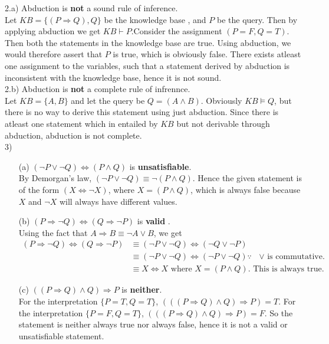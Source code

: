 \documentclass[11pt]{article}
\newcommand{\ra}{\Rightarrow}
\renewcommand{\iff}{\Leftrightarrow}
\begin{document}
2.a) Abduction is \textbf{not} a sound rule of inference. \\
Let $KB  = \{ (P \ra Q) , Q \}$ be the knowledge base , and $P$ be the query.
Then by applying abduction we get $KB \vdash P$.Consider the assignment $(P=F,Q=T)$. 
Then both the statements in the knowledge base are true. Using abduction, we would
therefore assert that $P$ is true, which is obviously false. There exists atleast one
assignment to the variables, such that a statement derived by abduction is inconsistent
with the knowledge base, hence it is not sound. \\

2.b) Abduction is \textbf{not} a complete rule of infrennce. \\
Let $KB  = \{ A, B \}$ and let the query be $Q = (A \land B)$. Obviously $KB \models Q$,
but there is no way to derive this statement using just abduction. Since there is atleast
one statement which in entailed by $KB$ but not derivable through abduction, abduction
is not complete.\\

3)
\begin{enumerate}
	\item[(a)] $(\lnot P \lor \lnot Q) \iff (P \land Q)$ is \textbf{unsatisfiable}. \\
	By Demorgan's law, $(\lnot P \lor \lnot Q) \equiv \lnot (P \land Q)$. Hence the given statement is
	of the form $(X \iff \lnot X)$, where $X = (P \land Q)$, which is always false because $X$ and $\lnot X$
	will always have different values.
	
	\item[(b)] $(P \ra \lnot Q) \iff (Q \ra \lnot P)$ is \textbf{valid} . \\
	Using the fact that $A \ra B \equiv \lnot A \lor B$, we get
	\begin{align*}
		(P \ra \lnot Q) \iff (Q \ra \lnot P) &\equiv (\lnot P \lor \lnot Q) \iff (\lnot Q \lor \lnot P) \\
		&\equiv (\lnot P \lor \lnot Q) \iff (\lnot P \lor \lnot Q) \because \text{ $\lor$ is commutative.} \\
		&\equiv X \iff X \text{ where $X = (P \land Q)$. This is always true.}
	\end{align*}
	
	\item[(c)] $((P \ra Q) \land Q) \ra P$ is \textbf{neither}. \\
	For the interpretation $\{ P = T, Q = T \}$, $(((P \ra Q) \land Q) \ra P) = T$. 
	For the interpretation $\{ P = F, Q = T \}$, $(((P \ra Q) \land Q) \ra P) = F$. So the
	statement is neither always true nor always false, hence it is not a valid or
	unsatisfiable statement.
\end{enumerate}
\end{document}
